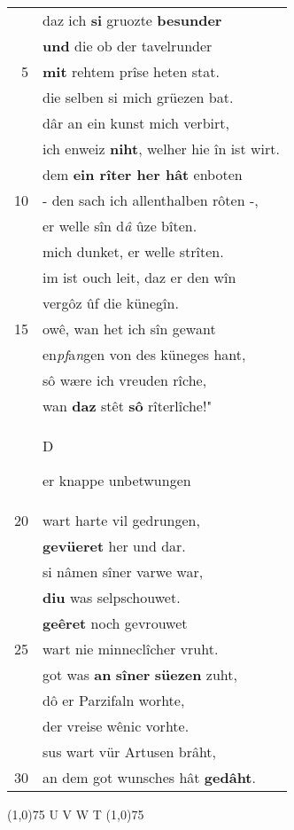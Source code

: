 \documentclass[8pt,a4paper,notitlepage]{article}
\begin{document}
\begin{table}[ht]
\begin{minipage}[t]{0.5\linewidth}
\begin{tabular}{rl}
 & daz ich \textbf{si} gruozte \textbf{besunder}\\ 
 & \textbf{und} die ob der tavelrunder\\ 
5 & \textbf{mit} rehtem prîse heten stat.\\ 
 & die selben si mich grüezen bat.\\ 
 & dâr an ein kunst mich verbirt,\\ 
 & ich enweiz \textbf{niht}, welher hie în ist wirt.\\ 
 & dem \textbf{ein rîter her hât} enboten\\ 
10 & - den sach ich allenthalben rôten -,\\ 
 & er welle sîn d\textit{â} ûze bîten.\\ 
 & mich dunket, er welle strîten.\\ 
 & im ist ouch leit, daz er den wîn\\ 
 & vergôz ûf die künegîn.\\ 
15 & owê, wan het ich sîn gewant\\ 
 & en\textit{pf}a\textit{n}gen von des küneges hant,\\ 
 & sô wære ich vreuden rîche,\\ 
 & wan \textbf{daz} stêt \textbf{sô} rîterlîche!"\\ 
 & \begin{large}D\end{large}er knappe unbetwungen\\ 
20 & wart harte vil gedrungen,\\ 
 & \textbf{gevüeret} her und dar.\\ 
 & si nâmen sîner varwe war,\\ 
 & \textbf{diu} was selpschouwet.\\ 
 & \textbf{geêret} noch gevrouwet\\ 
25 & wart nie minneclîcher vruht.\\ 
 & got was \textbf{an} \textbf{sîner} \textbf{süezen} zuht,\\ 
 & dô er Parzifaln worhte,\\ 
 & der vreise wênic vorhte.\\ 
 & sus wart vür Artusen brâht,\\ 
30 & an dem got wunsches hât \textbf{gedâht}.\\ 
\end{tabular}
\scriptsize
\line(1,0){75} \newline
U V W T \newline
\line(1,0){75} \newline

\end{minipage}
\end{table}
\end{document}
